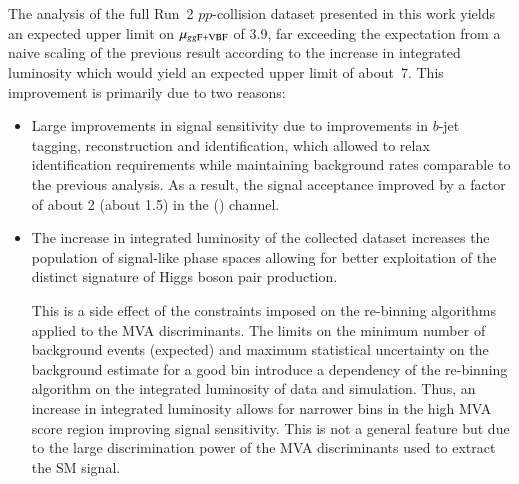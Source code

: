 The analysis of the full Run~2 $pp$-collision dataset presented in this work
yields an expected upper limit on $\mu_{gg\text{F}+\text{VBF}}$ of 3.9, far exceeding
the expectation from a naive scaling of the previous result according to the
increase in integrated luminosity which would yield an expected upper limit of
about~7. This improvement is primarily due to two reasons:
\begin{itemize}

\item Large improvements in signal sensitivity due to improvements in $b$-jet
  tagging, \tauhadvis reconstruction and identification, which allowed to relax
  identification requirements while maintaining background rates comparable to
  the previous analysis. As a result, the signal acceptance improved by a factor
  of about 2 (about 1.5) in the \hadhad (\lephad) channel.

\item The increase in integrated luminosity of the collected dataset increases
  the population of signal-like phase spaces allowing for better exploitation of
  the distinct signature of Higgs boson pair production.

  This is a side effect of the constraints imposed on the re-binning algorithms
  applied to the MVA discriminants. The limits on the minimum number of
  background events (expected) and maximum statistical uncertainty on the
  background estimate for a good bin introduce a dependency of the re-binning
  algorithm on the integrated luminosity of data and simulation. Thus, an
  increase in integrated luminosity allows for narrower bins in the high MVA
  score region improving signal sensitivity. This is not a general feature but
  due to the large discrimination power of the MVA discriminants used to extract
  the SM \HH signal.
\end{itemize}


